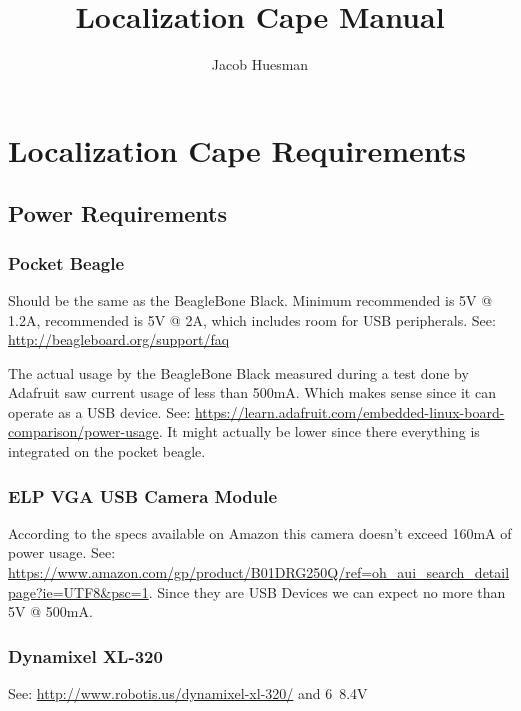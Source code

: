 \documentclass[]{book}
\title{Localization Cape Manual}
\author{Jacob Huesman}
\begin{document}
{
	\let\cleardoublepage\clearpage
	\maketitle
	\tableofcontents
}

\chapter{Localization Cape Requirements}
\section{Power Requirements}
\subsection{Pocket Beagle}
Should be the same as the BeagleBone Black. Minimum recommended is 5V @ 1.2A, recommended is 5V @ 2A, which includes room for USB peripherals. See: \url{http://beagleboard.org/support/faq}

The actual usage by the BeagleBone Black measured during a test done by Adafruit saw current usage of less than 500mA. Which makes sense since it can operate as a USB device. See: \url{https://learn.adafruit.com/embedded-linux-board-comparison/power-usage}. It might actually be lower since there everything is integrated on the pocket beagle.

\subsection{ELP VGA USB Camera Module}
According to the specs available on Amazon this camera doesn't exceed 160mA of power usage. See: \url{https://www.amazon.com/gp/product/B01DRG250Q/ref=oh_aui_search_detailpage?ie=UTF8&psc=1}. Since they are USB Devices we can expect no more than 5V @ 500mA. 

\subsection{Dynamixel XL-320}
See: \url{http://www.robotis.us/dynamixel-xl-320/} and
6~8.4V
\end{document}
